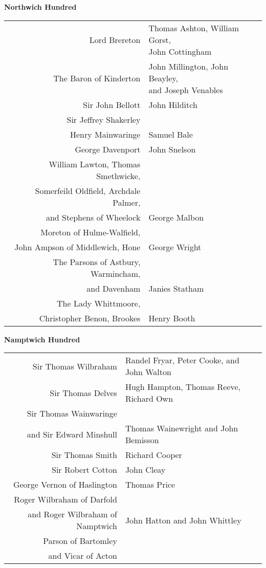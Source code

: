 \pagebreak

\begin{center}
  \Large
  \textbf{Northwich Hundred}
\end{center}

\begin{center}
  \small
  \begin{tabular}{rl}
    Lord Brereton & \makecell[l]{Thomas Ashton, William Gorst, \\ John Cottingham} \\
    The Baron of Kinderton & \makecell[l]{John Millington, John Beayley, \\ and Joseph Venables} \\
    Sir John Bellott & John Hilditch \\
    Sir Jeffrey Shakerley & \dotfill \\
    Henry Mainwaringe & Samuel Bale \\
    George Davenport & John Snelson \\
    William Lawton, Thomas Smethwicke, \\ Somerfeild Oldfield, Archdale Palmer, \\ and Stephens of Wheelock & George Malbon \\
    Moreton of Hulme-Walfield, \\ John Ampson of Middlewich, Hone & George Wright \\
    The Parsons of Astbury, Warmincham, \\ and Davenham & Janies Statham \\
    The Lady Whittmoore, \\ Christopher Benon, Brookes & Henry Booth \\
  \end{tabular}
\end{center}

\begin{center}
  \Large
  \textbf{Namptwich Hundred}
\end{center}

\begin{center}
  \small
  \begin{tabular}{rl}
    Sir Thomas Wilbraham & Randel Fryar, Peter Cooke, and John Walton \\
    Sir Thomas Delves & Hugh Hampton, Thomas Reeve, Richard Own \\
    Sir Thomas Wainwaringe \\ and Sir Edward Minshull & Thomas Wainewright and John Bemisson \\
    Sir Thomas Smith & Richard Cooper \\
    Sir Robert Cotton & John Cleay \\
    George Vernon of Haslington & Thomas Price \\
    Roger Wilbraham of Darfold \\ and Roger Wilbraham of Namptwich & John Hatton and John Whittley \\
    Parson of Bartomley \\ and Vicar of Acton & \dotfill \\
  \end{tabular}
\end{center}

